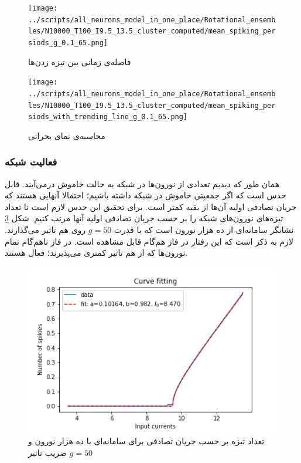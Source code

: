 \documentclass[12pt,onecolumn,a4paper]{article}
\begin{document}
\begin{figure}[h]
\centering
  \texttt{[image: ../scripts/all\_neurons\_model\_in\_one\_place/Rotational\_ensembles/N10000\_T100\_I9.5\_13.5\_cluster\_computed/mean\_spiking\_persiods\_g\_0.1\_65.png]}
 \caption{فاصله‌ی زمانی بین تیزه زدن‌ها}
  \label{fig:interspikes_rotational}
\end{figure}

\begin{figure}[h]
\centering
  \texttt{[image: ../scripts/all\_neurons\_model\_in\_one\_place/Rotational\_ensembles/N10000\_T100\_I9.5\_13.5\_cluster\_computed/mean\_spiking\_persiods\_with\_trending\_line\_g\_0.1\_65.png]}
 \caption{محاسبه‌ی نمای بحرانی}
  \label{fig:interspikes_rotational_trending_line}
\end{figure}


\subsubsection{فعالیت شبکه}
همان طور که دیدیم تعدادی از نورون‌ها در شبکه به حالت خاموش درمی‌آیند. قابل حدس است که اگر جمعیتی خاموش در شبکه داشته باشیم؛ احتمالا آنهایی هستند که جریان تصادفی اولیه آن‌ها از بقیه کمتر است. برای تحقیق این حدس لازم است تا تعداد تیزه‌های نورون‌های شبکه را بر حسب جریان تصادفی اولیه آنها مرتب کنیم. شکل \ref{fig:spikes_num_vs_background_current} نشانگر سامانه‌ای از ده هزار نورون است که با قدرت $g=50$ روی هم تاثیر می‌گذارند. لازم به ذکر است که این رفتار در فاز هم‌گام قابل مشاهده است. در فاز ناهم‌گام تمام نورون‌ها که از هم تاثیر کمتری می‌پذیرند؛ فعال هستند.


\begin{figure}[h]
\centering
  \includegraphics[width = 10 cm]{figs/Rotational/spikies_num_vs_input_fitted_curve_g50_input_3.5_13.5.png}
 \caption{تعداد تیزه بر حسب جریان تصادفی برای سامانه‌ای با ده هزار نورون و ضریب تاثیر $g=50$}
  \label{fig:spikes_num_vs_background_current}
\end{figure}
\end{document}
